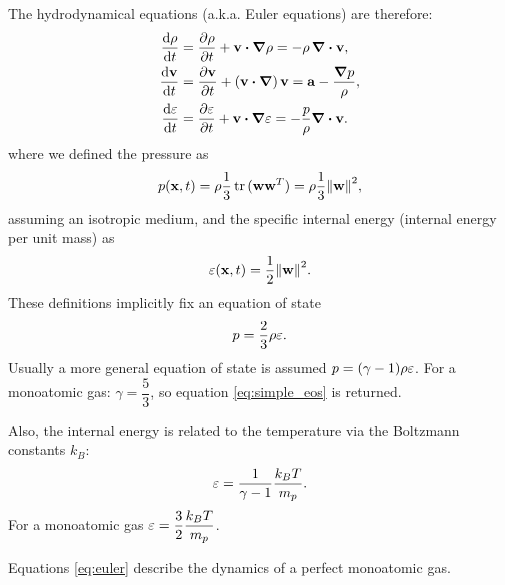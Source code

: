 The hydrodynamical equations (a.k.a. Euler equations) are therefore: 
\begin{align}
\label{eq:euler}
 \dv{\rho}{t} &= \pdv{\rho}{t} + \vect{v} \vdot \grad \rho = - \rho \,\div \vect{v}, \nonumber\\
 \dv{\vect{v}}{t} &= \pdv{\vect{v}}{t} + \left(\vect{v} \vdot \grad\right) \vect{v}  = \vect a - \frac{\grad p}{\rho},\\
 \dv{\energy}{t} &= \pdv{\energy}{t} + \vect{v} \vdot \grad \energy = - \frac{p}{\rho} \div \vect{v}. \nonumber%
\end{align}
where we defined the pressure as $$p(\vect x, t) = \rho \dfrac 1 3 \trace{(\vect w \vect w^T)} = \rho \dfrac 1 3 \norm{\vect w}^2,$$ assuming an isotropic medium, and the specific internal energy (internal energy per unit mass) as $$\varepsilon(\boldsymbol{\mathbf{x}}, t)=\dfrac 1 2 \norm{\boldsymbol{\mathbf{w}}}^2.$$ %
These definitions implicitly fix an equation of state
\begin{equation}
\label{eq:simple_eos}
p = \frac 2 3 \rho \varepsilon. 
\end{equation}
Usually a more general equation of state is assumed $p = (\gamma - 1) \rho \varepsilon$.
For a monoatomic gas: $\gamma = \dfrac{5}{3}$, so equation \eqref{eq:simple_eos} is returned.

Also, the internal energy is related to the temperature via the Boltzmann constants $k_B$:
\[ \varepsilon = \frac {1}{\gamma - 1} \frac{k_B T}{m_p}.\]
For a monoatomic gas $\displaystyle \varepsilon = \frac 3 2 \frac{k_B T}{m_p}$.


Equations \eqref{eq:euler} describe the dynamics of a perfect monoatomic gas.

